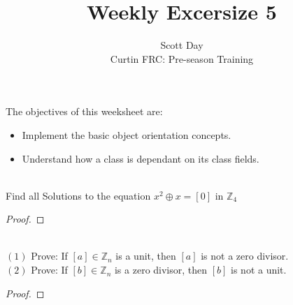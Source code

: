 \documentclass[12pt]{article}
\newcommand{\Z}{\mathbb{Z}}
\newenvironment{problem}[2][Problem]{\begin{trivlist}
\item[\hskip \labelsep {\bfseries #1}\hskip \labelsep {\bfseries #2.}]}{\end{trivlist}}
\begin{document}
\title{Weekly Excersize 5}
\author{Scott Day\\
Curtin FRC: Pre-season Training}

\maketitle


\begin{flushleft}
The objectives of this weeksheet are:

\begin{itemize}
    \item Implement the basic object orientation concepts.
    \item Understand how a class is dependant on its class fields.
\end{itemize}
\end{flushleft}



\begin{problem}{1}
\text{ }\\
Find all Solutions to the equation $x^{2} \oplus x = [0] $ in $\Z_{4}$
\end{problem}

\begin{proof}

\end{proof}

\begin{problem}{2}
\text{ }\\
$(1)$ Prove: If $[a] \in \Z_{n}$ is a unit, then $[a]$ is not a zero divisor.\\
$(2)$ Prove: If $[b] \in \Z_{n}$ is a zero divisor, then $[b]$ is not a unit.
\end{problem}

\begin{proof}

\end{proof}
\end{document}
